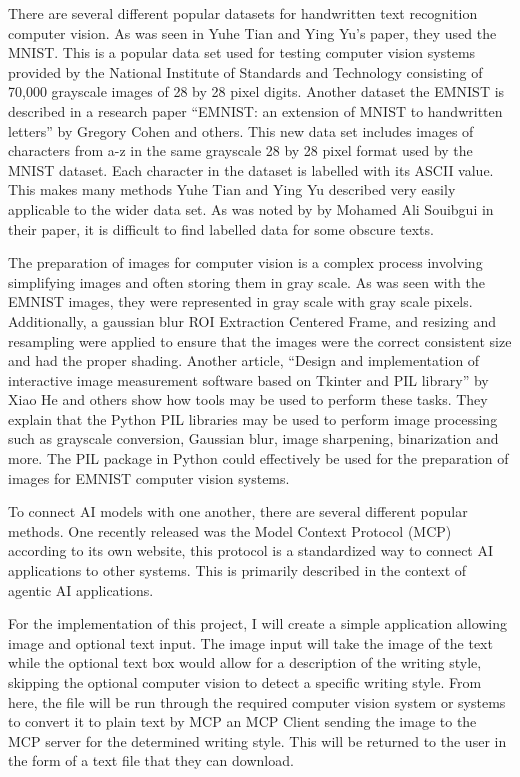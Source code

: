 \documentclass[12pt]{article}
\begin{document}
There are several different popular datasets for handwritten text recognition computer vision. As was seen in Yuhe Tian and Ying Yu’s paper, they used the MNIST. This is a popular data set used for testing computer vision systems provided by the National Institute of Standards and Technology consisting of 70,000 grayscale images of 28 by 28 pixel digits. Another dataset the EMNIST is described in a research paper “EMNIST: an extension of MNIST to handwritten letters” by Gregory Cohen and others. This new data set includes images of characters from a-z in the same grayscale 28 by 28 pixel format used by the MNIST dataset. Each character in the dataset is labelled with its ASCII value. This makes many methods Yuhe Tian and Ying Yu described very easily applicable to the wider data set. As was noted by by Mohamed Ali Souibgui in their paper, it is difficult to find labelled data for some obscure texts.

The preparation of images for computer vision is a complex process involving simplifying images and often storing them in gray scale. As was seen with the EMNIST images, they were represented in gray scale with gray scale pixels. Additionally, a gaussian blur ROI Extraction Centered Frame, and resizing and resampling were applied to ensure that the images were the correct consistent size and had the proper shading. Another article, “Design and implementation of interactive image measurement software based on Tkinter and PIL library” by Xiao He and others show how tools may be used to perform these tasks. They explain that the Python PIL libraries may be used to perform image processing such as grayscale conversion, Gaussian blur, image sharpening, binarization and more. The PIL package in Python could effectively be used for the preparation of images for EMNIST computer vision systems.

To connect AI models with one another, there are several different popular methods. One recently released was the Model Context Protocol (MCP) according to its own website, this protocol is a standardized way to connect AI applications to other systems. This is primarily described in the context of agentic AI applications.

For the implementation of this project, I will create a simple application allowing image and optional text input. The image input will take the image of the text while the optional text box would allow for a description of the writing style, skipping the optional computer vision to detect a specific writing style. From here, the file will be run through the required computer vision system or systems to convert it to plain text by MCP an MCP Client sending the image to the MCP server for the determined writing style. This will be returned to the user in the form of a text file that they can download. 
\end{document}

